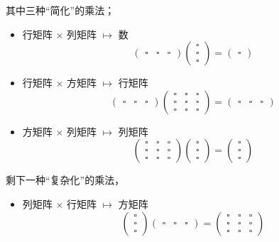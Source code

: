 其中三种“简化”的乘法；
\begin{itemize}
\item 行矩阵 $\times$ 列矩阵 $\mapsto$ 数
$$
\begin{pmatrix}
\square & \square & \square
\end{pmatrix}
\begin{pmatrix}
\square \\
\square \\
\square
\end{pmatrix}
=
\begin{pmatrix}
\square
\end{pmatrix}
$$
\item 行矩阵 $\times$ 方矩阵 $\mapsto$ 行矩阵
$$
\begin{pmatrix}
\square & \square & \square
\end{pmatrix}
\begin{pmatrix}
\square & \square & \square \\
\square & \square & \square \\
\square & \square & \square
\end{pmatrix}
=
\begin{pmatrix}
\square & \square & \square
\end{pmatrix}
$$
\item 方矩阵 $\times$ 列矩阵 $\mapsto$ 列矩阵
$$
\begin{pmatrix}
\square & \square & \square \\
\square & \square & \square \\
\square & \square & \square
\end{pmatrix}
\begin{pmatrix}
\square \\
\square \\
\square
\end{pmatrix}
=
\begin{pmatrix}
\square \\
\square \\
\square
\end{pmatrix}
$$
\end{itemize}

剩下一种“复杂化”的乘法，
\begin{itemize}
\item 列矩阵 $\times$ 行矩阵 $\mapsto$ 方矩阵
$$
\begin{pmatrix}
\square \\
\square \\
\square
\end{pmatrix}
\begin{pmatrix}
\square & \square & \square
\end{pmatrix}
=
\begin{pmatrix}
\square & \square & \square \\
\square & \square & \square \\
\square & \square & \square
\end{pmatrix}
$$
\end{itemize}


